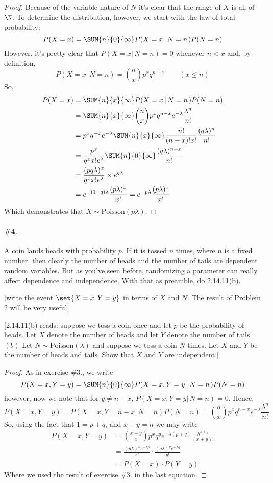 \documentclass[12pt,titlepage]{article}
\newcommand{\given}[1]{ \left| \, {#1} \right.}
\begin{document}
\begin{proof}Because of the variable nature of $N$ it's clear that the range of $X$ is all of $\N$. To determine the distribution, however, we start with the law of total probability:
\[
P(X=x) = \SUM{n}{0}{\infty}P(X=x\given{N=n})P(N=n)
\]
However, it's pretty clear that $P(X=x\given{N=n}) = 0$ whenever $n < x$ and, by definition,
\[
P(X=x\given{N=n}) = \binom{n}{x}p^x q^{n-x} \qquad (x \leq n)
\]
So, 
\begin{align*}
P(X=x) &= \SUM{n}{x}{\infty}P(X=x\given{N=n})P(N=n) \\
&= \SUM{n}{x}{\infty}\binom{n}{x}p^{x}q^{n-x} e^{-\lambda}\frac{\lambda^{n}}{n!} \\
&= p^x q^{-x}e^{-\lambda} \SUM{n}{x}{\infty} \frac{n!}{(n-x)! x!} \frac{(q\lambda)^n}{n!} \\
&= \frac{p^x}{q^x x! e^{\lambda}} \SUM{n}{0}{\infty} \frac{(q\lambda)^{n+x}}{n!} \\
&= \frac{ (pq\lambda)^x}{q^x x! e^{\lambda}} \times e^{q\lambda} \\
&= e^{-(1-q)\lambda} \frac{(p\lambda)^x}{x!}  = e^{-p\lambda} \frac{(p\lambda)^x}{x!}
\end{align*}
Which demonstrates that $X \sim \text{Poisson}(p\lambda)$. 
\end{proof}

\paragraph{\#4.} A coin lands heads with probability $p$. If it is tossed $n$ times, where $n$ is a fixed number, then clearly the number of heads and the number of tails are dependent random variables. But as you've seen before, randomizing a parameter can really affect dependence and independence. With that as preamble, do 2.14.11(b).

[\Hint write the event $\set{X=x,Y=y}$ in terms of $X$ and $N$. The result of Problem 2 will be very useful]

[2.14.11(b) reads: suppose we toss a coin once and let $p$ be the probability of heads. Let $X$ denote the number of heads and let $Y$ denote the number of tails. $(b)$ Let $N \sim \text{Poisson}(\lambda)$ and suppose we toss a coin $N$ times. Let $X$ and $Y$ be the number of heads and tails. Show that $X$ and $Y$ are independent.]

\begin{proof}
As in exercise \#3., we write
\[
P(X=x,Y=y) = \SUM{n}{0}{\infty}P(X=x,Y=y\given{N=n})P(N=n)
\]
however, now we note that for $y \neq n-x$, $P(X=x,Y=y \given{N=n}) = 0$. Hence, 
\[
P(X=x,Y=y) = P(X=x,Y=n-x\given{N=n})P(N=n) = \binom{n}{x}p^{x}q^{n-x} e^{-\lambda}\frac{\lambda^n}{n!}
\]
So, using the fact that $1 = p+q$, and $x+y=n$ we may write
\begin{align*}
P(X=x,Y=y) &= \binom{x+y}{x} p^x q^{y} e^{-\lambda(p+q)} \frac{\lambda^{x+y}}{(x+y)!} \\
&= \frac{(p\lambda)^x e^{-\lambda p}}{x!} \cdot \frac{(q\lambda)^{y}e^{-\lambda q}}{y!} \\
&= P(X=x) \cdot P(Y=y) 
\end{align*}
Where we used the result of exercise \#3. in the last equation.
\end{proof}
\end{document}

